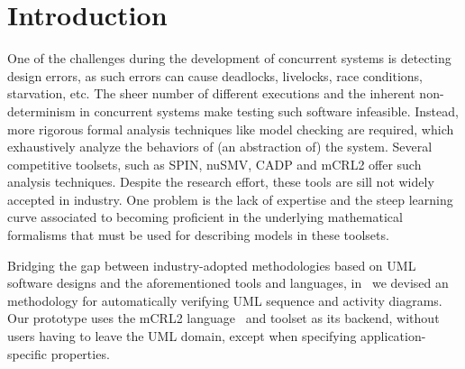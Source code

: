 \documentclass[letter]{llncs}
\begin{document}
\section{Introduction}
\vspace{-10 pt}

\label{sec:Introduction}
One of the challenges during the development of concurrent systems is detecting
design errors, as such errors can cause deadlocks, livelocks, race conditions,
starvation, etc. The sheer number of different executions and the
inherent non-determinism in concurrent systems make testing such software
infeasible. Instead, more rigorous formal analysis techniques like
model checking are required, which exhaustively analyze the behaviors of 
(an abstraction of) the system. Several competitive 
toolsets, such as SPIN, nuSMV, CADP and mCRL2 offer such analysis techniques.
Despite the research effort, these tools are sill not widely accepted
in industry. One problem is the lack of expertise and the steep learning
curve associated to becoming proficient in the underlying mathematical
formalisms that must be used for describing models in these toolsets.

Bridging the gap between industry-adopted methodologies based on
UML software designs and the aforementioned tools and languages,
in~\cite{DBLP:dblp_conf/nfm/RemenskaTWHVCB13} we devised an
methodology for automatically verifying UML 
sequence and activity diagrams.  Our prototype uses the mCRL2
language~\cite{FormalLanguagemCRL2} and toolset as its backend,
without users having to leave the UML domain, except when specifying
application-specific properties.


\end{document}
